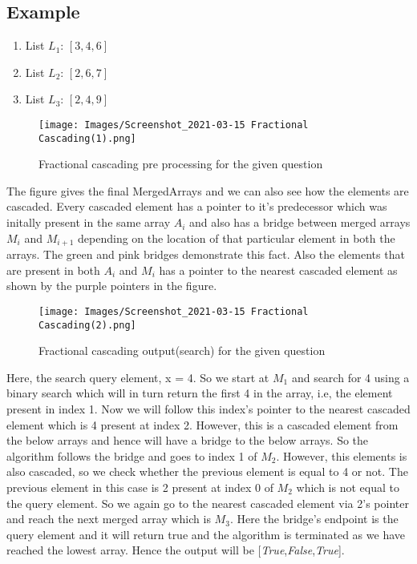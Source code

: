 \documentclass[11pt]{article}
\begin{document}
\subsection{Example}
\begin{enumerate}[label=(\alph*)]
    \item List $L_1$: $[3,4,6]$
    \item List $L_2$: $[2,6,7]$
    \item List $L_3$: $[2,4,9]$
\end{enumerate}

\begin{figure}[!h]
    \centering
    \texttt{[image: Images/Screenshot\_2021-03-15 Fractional Cascading(1).png]}
    \caption{Fractional cascading pre processing for the given question}
    \label{fig:label}
\end{figure}
    


The figure gives the final MergedArrays and we can also see how the elements are cascaded. Every cascaded element has a pointer to it's predecessor which was initally present in the same array $A_i$ and also has a bridge between merged arrays $M_i$ and $M_{i+1}$ depending on the location of that particular element in both the arrays. The green and pink bridges demonstrate this fact. Also the elements that are present in both $A_i$ and $M_i$ has a pointer to the nearest cascaded element as shown by the purple pointers in the figure. 



\begin{figure}[H]
    \centering
    \texttt{[image: Images/Screenshot\_2021-03-15 Fractional Cascading(2).png]}
    \caption{Fractional cascading output(search) for the given question}
    \label{fig:label}
\end{figure}

Here, the search query element, x = 4. So we start at $M_1$ and search for 4 using a binary search which will in turn return the first 4 in the array, i.e, the element present in index 1. Now we will follow this index's pointer to the nearest cascaded element which is 4 present at index 2. However, this is a cascaded element from the below arrays and hence will have a bridge to the below arrays. So the algorithm follows the bridge and goes to index 1 of $M_2$. However, this elements is also cascaded, so we check whether the previous element is equal to 4 or not. The previous element in this case is 2 present at index 0 of $M_2$ which is not equal to the query element. So we again go to the nearest cascaded element via 2's pointer and reach the next merged array which is $M_3$. Here the bridge's endpoint is the query element and it will return true and the algorithm is terminated as we have reached the lowest array. Hence the output will be [\textit{True},\textit{False},\textit{True}].
\end{document}
